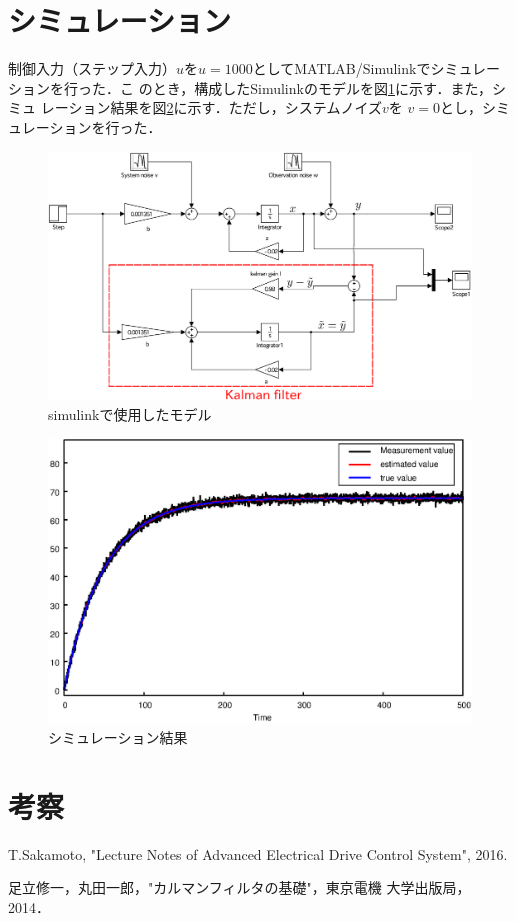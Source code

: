 \documentclass[a4paper,12pt]{jarticle}
\begin{document}
\section{シミュレーション}
制御入力（ステップ入力）$u$を$u=1000$としてMATLAB/Simulinkでシミュレーションを行った．こ
のとき，構成したSimulinkのモデルを図\ref{fig:kalman_b}に示す．また，シミュ
レーション結果を図\ref{fig:kalman_g}に示す．ただし，システムノイズ$v$を
$v=0$とし，シミュレーションを行った．
%
\begin{figure}[htbp]
 \begin{center}
  \includegraphics[width = 150mm]{fig/kalmanfilter2.eps}
 \end{center}
 \caption{simulinkで使用したモデル}
 \label{fig:kalman_b}
\end{figure}
%
\begin{figure}[htbp]
 \begin{center}
  \includegraphics[width = 170mm]{fig/kalmanfilterG.eps}
 \end{center}
 \caption{シミュレーション結果}
 \label{fig:kalman_g}
\end{figure}
%
\section{考察}

%
\begin{thebibliography}{99}

  T.Sakamoto,
		 "Lecture Notes of Advanced Electrical Drive Control System", 2016.

  足立修一，丸田一郎，"カルマンフィルタの基礎"，東京電機
		 大学出版局，2014．

\end{thebibliography}
\end{document}
